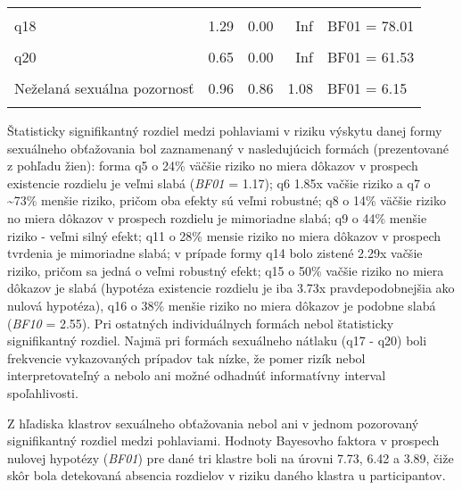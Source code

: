 \documentclass[
]{article}
\begin{document}
\begin{table}[H]
{\begin{tabular}[t]{lrrrl}
\cellcolor{gray!6}{q17} & \cellcolor{gray!6}{0.52} & \cellcolor{gray!6}{0.26} & \cellcolor{gray!6}{1.01} & \cellcolor{gray!6}{BF01 = 3.5}\\
q18 & 1.29 & 0.00 & Inf & BF01 = 78.01\\
\cellcolor{gray!6}{q19} & \cellcolor{gray!6}{0.64} & \cellcolor{gray!6}{0.00} & \cellcolor{gray!6}{Inf} & \cellcolor{gray!6}{BF01 = 60.89}\\
q20 & 0.65 & 0.00 & Inf & BF01 = 61.53\\
\addlinespace
\cellcolor{gray!6}{Rodovo motivované obťažovanie} & \cellcolor{gray!6}{0.98} & \cellcolor{gray!6}{0.93} & \cellcolor{gray!6}{1.04} & \cellcolor{gray!6}{BF01 = 7.73}\\
Neželaná sexuálna pozornosť & 0.96 & 0.86 & 1.08 & BF01 = 6.15\\
\cellcolor{gray!6}{Sexuálny nátlak} & \cellcolor{gray!6}{0.56} & \cellcolor{gray!6}{0.29} & \cellcolor{gray!6}{1.03} & \cellcolor{gray!6}{BF01 = 3.84}\\
\bottomrule
\end{tabular}}
\end{table}

Štatisticky signifikantný rozdiel medzi pohlaviami v riziku výskytu danej formy sexuálneho obťažovania bol zaznamenaný v nasledujúcich formách (prezentované z pohľadu žien): forma q5 o 24\% väčšie riziko no miera dôkazov v prospech existencie rozdielu je veľmi slabá (\emph{BF01} = 1.17); q6 1.85x vačšie riziko a q7 o \textasciitilde73\% menšie riziko, pričom oba efekty sú veľmi robustné; q8 o 14\% väčšie riziko no miera dôkazov v prospech rozdielu je mimoriadne slabá; q9 o 44\% menšie riziko - veľmi silný efekt; q11 o 28\% mensie riziko no miera dôkazov v prospech tvrdenia je mimoriadne slabá; v prípade formy q14 bolo zistené 2.29x vačšie riziko, pričom sa jedná o veľmi robustný efekt; q15 o 50\% vačšie riziko no miera dôkazov je slabá (hypotéza existencie rozdielu je iba 3.73x pravdepodobnejšia ako nulová hypotéza), q16 o 38\% menšie riziko no miera dôkazov je podobne slabá (\emph{BF10} = 2.55). Pri ostatných individuálnych formách nebol štatisticky signifikantný rozdiel. Najmä pri formách sexuálneho nátlaku (q17 - q20) boli frekvencie vykazovaných prípadov tak nízke, že pomer rizík nebol interpretovateľný a nebolo ani možné odhadnúť informatívny interval spoľahlivosti.

Z hľadiska klastrov sexuálneho obťažovania nebol ani v jednom pozorovaný signifikantný rozdiel medzi pohlaviami. Hodnoty Bayesovho faktora v prospech nulovej hypotézy (\emph{BF01}) pre dané tri klastre boli na úrovni 7.73, 6.42 a 3.89, čiže skôr bola detekovaná absencia rozdielov v riziku daného klastra u participantov.
\end{document}
